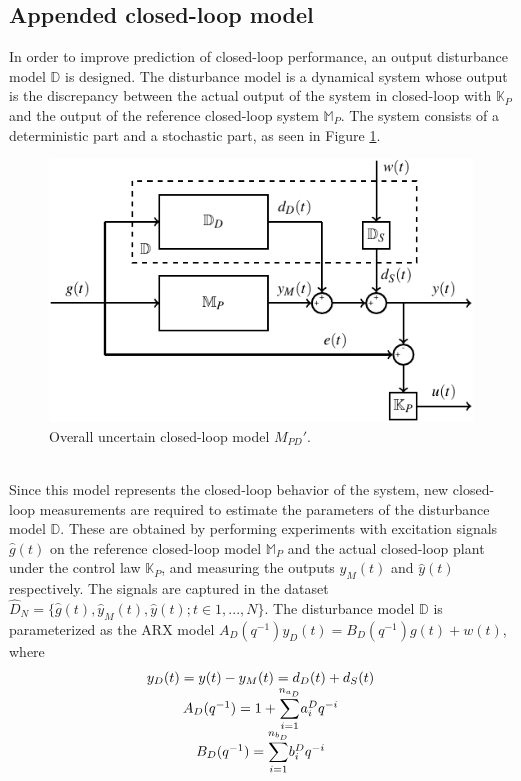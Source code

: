 \documentclass[letterpaper, 10 pt, conference]{ieeeconf}  %
\begin{document}
	\subsection{Appended closed-loop model}
	In order to improve prediction of closed-loop performance, an output disturbance model $\mathbb{D}$ is designed. The disturbance model is a dynamical system whose output is the discrepancy between the actual output of the system in closed-loop with  $\mathbb{K}_P$ and the output of the reference closed-loop system $\mathbb{M}_P$. The system consists of a deterministic part and a stochastic part, as seen in Figure \ref{Appended}.
	\begin{figure}[h!]
		\hspace{30pt}
		\includegraphics[scale = 0.7]{Mp-D-E.pdf}
		\caption{Overall uncertain closed-loop model $M_{PD}'$.}
		\label{Appended}
	\end{figure}
	\vspace{-5pt} \\
	Since this model represents the closed-loop behavior of the system, new closed-loop measurements are required to estimate the parameters of the disturbance model $\mathbb{D}$. These are obtained by performing experiments with excitation signals $\hat{g}(t)$ on the reference closed-loop model $\mathbb{M}_P$ and the actual closed-loop plant under the control law $\mathbb{K}_P$, and measuring the outputs $\hat{y}_M(t)$ and $\hat{y}(t)$ respectively. The signals are captured in the dataset $\hat{D}_{N}=\{\hat{g}(t),\hat{y}_M(t),\hat{y}(t);t\in{1,...,N}\}$.
	The disturbance model $\mathbb{D}$ is parameterized as the ARX model $A_D(q^{-1})y_D(t) = B_D(q^{-1})g(t)+w(t)$, where 
	\begin{equation*}
	\begin{matrix}
	y_D(t) = y(t) - y_M(t) = d_D(t)+d_S(t) \\ 
	A_D(q^{-1}) = 1+\mathlarger{\sum\limits_{i=1}^{n_{a_D}}}a_i^Dq^{-i}\\
	B_D(q^{-1}) = \mathlarger{\sum\limits_{i=1}^{n_{b_D}}}b_i^Dq^{-i}
	\end{matrix}  
	\end{equation*}
\end{document}
